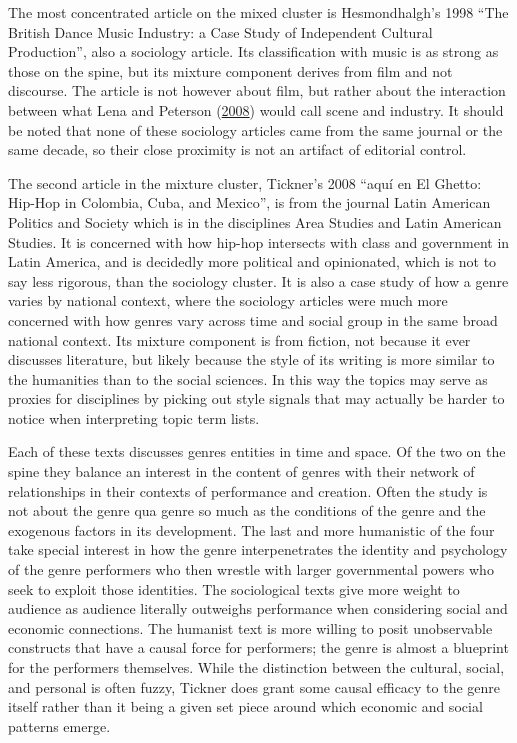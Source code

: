 \documentclass[]{book}
\theoremstyle{definition}
\theoremstyle{definition}
\theoremstyle{definition}
\theoremstyle{remark}
\begin{document}
The most concentrated article on the mixed cluster is Hesmondhalgh's
1998 ``The British Dance Music Industry: a Case Study of Independent
Cultural Production'', also a sociology article. Its classification with
music is as strong as those on the spine, but its mixture component
derives from film and not discourse. The article is not however about
film, but rather about the interaction between what Lena and Peterson
(\protect\hyperlink{ref-Lena2008Classification}{2008}) would call scene
and industry. It should be noted that none of these sociology articles
came from the same journal or the same decade, so their close proximity
is not an artifact of editorial control.

The second article in the mixture cluster, Tickner's 2008 ``aquí en El
Ghetto: Hip-Hop in Colombia, Cuba, and Mexico'', is from the journal
Latin American Politics and Society which is in the disciplines Area
Studies and Latin American Studies. It is concerned with how hip-hop
intersects with class and government in Latin America, and is decidedly
more political and opinionated, which is not to say less rigorous, than
the sociology cluster. It is also a case study of how a genre varies by
national context, where the sociology articles were much more concerned
with how genres vary across time and social group in the same broad
national context. Its mixture component is from fiction, not because it
ever discusses literature, but likely because the style of its writing
is more similar to the humanities than to the social sciences. In this
way the topics may serve as proxies for disciplines by picking out style
signals that may actually be harder to notice when interpreting topic
term lists.

Each of these texts discusses genres entities in time and space. Of the
two on the spine they balance an interest in the content of genres with
their network of relationships in their contexts of performance and
creation. Often the study is not about the genre qua genre so much as
the conditions of the genre and the exogenous factors in its
development. The last and more humanistic of the four take special
interest in how the genre interpenetrates the identity and psychology of
the genre performers who then wrestle with larger governmental powers
who seek to exploit those identities. The sociological texts give more
weight to audience as audience literally outweighs performance when
considering social and economic connections. The humanist text is more
willing to posit unobservable constructs that have a causal force for
performers; the genre is almost a blueprint for the performers
themselves. While the distinction between the cultural, social, and
personal is often fuzzy, Tickner does grant some causal efficacy to the
genre itself rather than it being a given set piece around which
economic and social patterns emerge.
\end{document}
